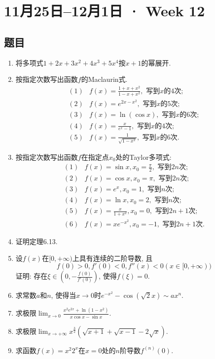 \documentclass[UTF8,11pt, a4paper, oneside, fontset=none]{ctexbook}
\begin{document}
\clearpage

\section{11月25日--12月1日 · Week 12}

\subsection*{题目}

\begin{enumerate}
\item 将多项式$1 + 2x + 3x^2 + 4x^3 + 5x^4$按$x+1$的幂展开.
\item 按指定次数写出函数$f$的Maclaurin式.
\begin{align*}
(1) & f(x) = \frac{1 + x + x^2}{1 - x + x^2}, \text{ 写到$x$的4次};\\
(2) & f(x) = e^{2x - x^2}, \text{ 写到$x$的5次};\\
(3) & f(x) = \ln (\cos x), \text{ 写到$x$的6次};\\
(4) & f(x) = \frac{x}{e^x -1}, \text{ 写到$x$的4次};\\
(5) & f(x) = \frac{1}{\sqrt{1 - x^2}}, \text{ 写到$x$的6次}.
\end{align*}
\item 按指定次数写出函数$f$在指定点$x_0$处的Taylor多项式:
\begin{align*}
(1) & f(x) = \sin x, x_0 = \frac{\pi}{2}, \text{ 写到$2n$次};\\
(2) & f(x) = \cos x, x_0 = \pi, \text{ 写到$2n$次};\\
(3) & f(x) = e^x, x_0 = 1, \text{ 写到$n$次};\\
(4) & f(x) = \ln x, x_0 = 2, \text{ 写到$n$次};\\
(5) & f(x) = \frac{x}{1 + x^2}, x_0 = 0, \text{ 写到$2n+1$次};\\
(6) & f(x) = xe^{-x^2}, x_0 = -1, \text{ 写到$2n+1$次}.
\end{align*}

\item 证明定理6.13. 

\item 设$f(x)$在$[0, + \infty)$上具有连续的二阶导数, 且
\[
f(0) >0, f'(0) <0, f''(x) < 0 (x \in [0, + \infty))
\]
证明: 存在$\xi \in \left( 0, - \frac{f(0)}{f'(0)}\right)$, 使得$f(\xi ) = 0$.

\item 求常数$a$和$n$, 使得当$x \to 0$时$e^{-x^2} - \cos(\sqrt{2}x) \sim ax^n$.

\item 求极限$\lim_{x \to 0} \frac{x^2 e^{2x} + \ln (1 - x^2)}{x \cos x - \sin x}$.

\item 求极限$\lim_{x \to +\infty} x^{\frac{3}{2}} (\sqrt{x+1} + \sqrt{x-1} - 2 \sqrt x)$.

\item 求函数$f(x) = x^2 2^x$在$x = 0$处的$n$阶导数$f^{(n)}(0)$.


\end{enumerate}
\end{document}
